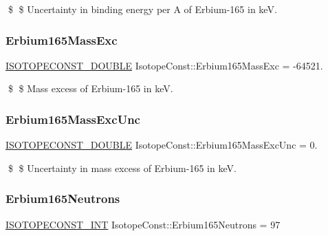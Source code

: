 \$ \$ Uncertainty in binding energy per A of Erbium-\/165 in keV. \mbox{\label{group___isotope_const-_erbium-_er165_gafae432d83e59b4b7a48dd346c230eb39}} 
\subsubsection{\texorpdfstring{Erbium165\+Mass\+Exc}{Erbium165MassExc}}
{\footnotesize\ttfamily \mbox{\hyperlink{group___isotope_const-_macros_ga8f45a7272ce02c0b4c65c44636ed719a}{I\+S\+O\+T\+O\+P\+E\+C\+O\+N\+S\+T\+\_\+\+D\+O\+U\+B\+LE}} Isotope\+Const\+::\+Erbium165\+Mass\+Exc = -\/64521.}

\$ \$ Mass excess of Erbium-\/165 in keV. \mbox{\label{group___isotope_const-_erbium-_er165_ga8ca2112c7b44f6a4c8b636921674ab9e}} 
\subsubsection{\texorpdfstring{Erbium165\+Mass\+Exc\+Unc}{Erbium165MassExcUnc}}
{\footnotesize\ttfamily \mbox{\hyperlink{group___isotope_const-_macros_ga8f45a7272ce02c0b4c65c44636ed719a}{I\+S\+O\+T\+O\+P\+E\+C\+O\+N\+S\+T\+\_\+\+D\+O\+U\+B\+LE}} Isotope\+Const\+::\+Erbium165\+Mass\+Exc\+Unc = 0.}

\$ \$ Uncertainty in mass excess of Erbium-\/165 in keV. \mbox{\label{group___isotope_const-_erbium-_er165_ga8ef65ff0ec2779f80ef01dcd03aca40c}} 
\subsubsection{\texorpdfstring{Erbium165\+Neutrons}{Erbium165Neutrons}}
{\footnotesize\ttfamily \mbox{\hyperlink{group___isotope_const-_macros_ga5f18360b3e99483a35c32d789e62621c}{I\+S\+O\+T\+O\+P\+E\+C\+O\+N\+S\+T\+\_\+\+I\+NT}} Isotope\+Const\+::\+Erbium165\+Neutrons = 97}

